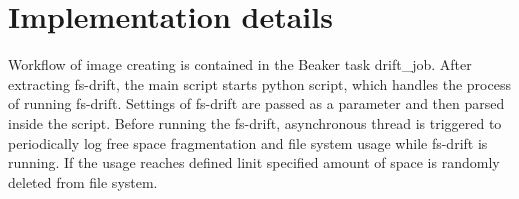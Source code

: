 \documentclass[
  color, %
  table, %
  lof,   %
  lot,   %
]{fithesis3}
\begin{document}





\section{Implementation details}
Workflow of image creating is contained in the Beaker task drift\_job. After extracting fs-drift, the main script starts python script, which handles the process of running fs-drift. Settings of fs-drift are passed as a parameter and then parsed inside the script. Before running the fs-drift, asynchronous thread is triggered to periodically log free space fragmentation and file system usage while fs-drift is running. If the usage reaches defined linit specified amount of space is randomly deleted from file system\footnotemark[2].
\end{document}
